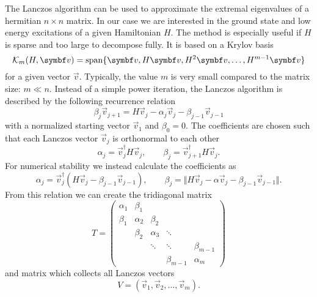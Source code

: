 The Lanczos algorithm \cite{Lanczos1950} can be used to approximate the extremal eigenvalues
of a hermitian $n\times n$ matrix.
In our case we are interested in the ground state and low energy excitations of a
given Hamiltonian $H$.
The method is especially useful if $H$ is sparse and too large to decompose fully.
It is based on a Krylov basis
\begin{equation}
    \mathcal{K}_m(H, \vec{v}) = \spn\{\vec{v}, H\vec{v}, H^2\vec{v}, \ldots, H^{m-1}\vec{v}\}
\end{equation}
for a given vector $\vec{v}$.
Typically, the value $m$ is very small compared to the matrix size: $m \ll n$.
Instead of a simple power iteration, the Lanczos algorithm is described by the
following recurrence relation
\begin{equation}
    \beta_j\vec{v}_{j+1} = H\vec{v}_j - \alpha_j\vec{v}_j - \beta_{j-1}\vec{v}_{j-1}
    \label{eq:Lanczos-recurrence}
\end{equation}
with a normalized starting vector $\vec{v}_1$ and $\beta_0 = 0$.
The coefficients are chosen such that each Lanczos vector $\vec{v}_j$ is orthonormal to each other
\begin{equation}
    \alpha_j = \vec{v}_j^\dag H \vec{v}_j,
    \qquad
    \beta_j = \vec{v}_{j+1}^\dag H \vec{v}_j.
\end{equation}
For numerical stability \cite{Paige1972, Paige1976}
we instead calculate the coefficients as
\begin{equation}
    \alpha_j = \vec{v}_j^\dag(H \vec{v}_j - \beta_{j-1}\vec{v}_{j-1}),
    \qquad
    \beta_j = \Vert H\vec{v}_j - \alpha\vec{v}_j -  \beta_{j-1}\vec{v}_{j-1} \Vert.
\end{equation}
From this relation we can create the tridiagonal matrix
\begin{equation}
    T
    =
    \begin{pmatrix}
        \alpha_1 & \beta_1  &          &             &             \\
        \beta_1  & \alpha_2 & \beta_2  &             &             \\
                 & \beta_2  & \alpha_3 & \ddots      &             \\
                 &          & \ddots   & \ddots      & \beta_{m-1} \\
                 &          &          & \beta_{m-1} & \alpha_m
    \end{pmatrix}
\end{equation}
and matrix which collects all Lanczos vectors
\begin{equation}
    V = (\vec{v}_1, \vec{v}_2, \ldots, \vec{v}_m).
\end{equation}
